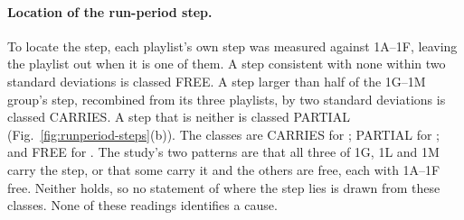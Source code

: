 \paragraph{Location of the run-period step.} To locate the step, each playlist's own step was measured against 1A--1F, leaving the playlist out when it is one of them. A step consistent with none within two standard deviations is classed FREE. A step larger than half of the 1G--1M group's step, recombined from its three playlists, by two standard deviations is classed CARRIES. A step that is neither is classed PARTIAL (Fig.~\ref{fig:runperiod-steps}(b)). The classes are CARRIES for ; PARTIAL for ; and FREE for . The study's two patterns are that all three of 1G, 1L and 1M carry the step, or that some carry it and the others are free, each with 1A--1F free. Neither holds, so no statement of where the step lies is drawn from these classes. None of these readings identifies a cause.
